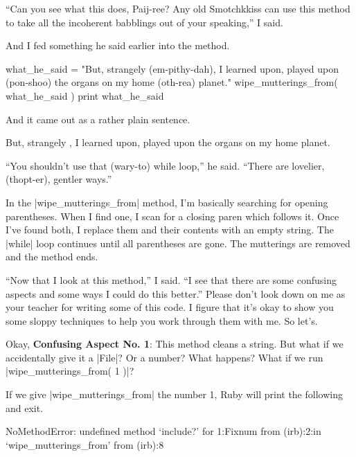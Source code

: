 \documentclass[12pt,twoside]{report}
\begin{document}
``Can you see what this does, Paij-ree?  Any old Smotchkkiss can use
this method to take all the incoherent babblings out of your
speaking,'' I said.

And I fed something he said earlier into the method.


\begin{rubycode}

 what_he_said = "But, strangely (em-pithy-dah),
   I learned upon, played upon (pon-shoo) the
   organs on my home (oth-rea) planet."
 wipe_mutterings_from( what_he_said )
 print what_he_said

\end{rubycode}


And it came out as a rather plain sentence.


\begin{consolecode}

 But, strangely ,
 I learned upon, played upon the
 organs on my home planet.

\end{consolecode}


``You shouldn't use that (wary-to) while loop,'' he said.  ``There are
lovelier, (thopt-er), gentler ways.''

In the \rubyinline|wipe_mutterings_from| method, I'm
basically searching for opening parentheses.  When I find one, I scan
for a closing paren which follows it.  Once I've found both, I replace
them and their contents with an empty string.  The
\rubyinline|while| loop continues until all
parentheses are gone. The mutterings are removed and the method ends.

``Now that I look at this method,'' I said.  ``I see that there are
some confusing aspects and some ways I could do this better.''  Please
don't look down on me as your teacher for writing some of this code.
I figure that it's okay to show you some sloppy techniques to help you
work through them with me.  So let's.

Okay, {\bf Confusing Aspect No. 1}: This method cleans a string.  But
what if we accidentally give it a \rubyinline|File|?
Or a number?  What happens?  What if we run
\rubyinline|wipe_mutterings_from( 1 )|?

If we give \rubyinline|wipe_mutterings_from| the
number 1, Ruby will print the following and exit.


\begin{consolecode}

 NoMethodError: undefined method `include?' for 1:Fixnum
         from (irb):2:in `wipe_mutterings_from'
         from (irb):8

\end{consolecode}
\end{document}
